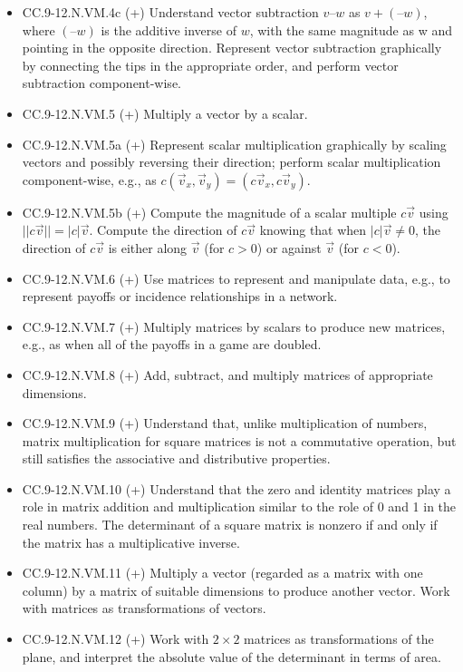 \documentclass{article}
\begin{document}
\begin{enumerate}
\begin{itemize}
		\item CC.9-12.N.VM.4c (+) Understand vector subtraction $v – w$ as $v + (–w)$, where $(–w)$ is the additive inverse of $w$, with the same magnitude as w and pointing in the opposite direction. Represent vector subtraction graphically by connecting the tips in the appropriate order, and perform vector subtraction component-wise.
		\item CC.9-12.N.VM.5 (+)  Multiply a vector by a scalar.
		\item CC.9-12.N.VM.5a (+) Represent scalar multiplication graphically by scaling vectors and possibly reversing their direction; perform scalar multiplication component-wise, e.g., as $c(\vec{v}_x, \vec{v}_y) = (c\vec{v}_x, c\vec{v}_y)$.
		\item CC.9-12.N.VM.5b (+) Compute the magnitude of a scalar multiple $c\vec{v}$ using $||c\vec{v}|| =|c|\vec{v}$. Compute the direction of $c\vec{v}$ knowing that when $|c|\vec{v} \neq 0$, the direction of $c\vec{v}$ is either along $\vec{v}$ (for $c > 0$) or against $\vec{v}$ (for $c < 0$).
		\item CC.9-12.N.VM.6 (+)  Use matrices to represent and manipulate data, e.g., to represent payoffs or incidence relationships in a network. 
		\item CC.9-12.N.VM.7 (+)  Multiply matrices by scalars to produce new matrices, e.g., as when all of the payoffs in a game are doubled. 
		\item CC.9-12.N.VM.8 (+)  Add, subtract, and multiply matrices of appropriate dimensions.
		\item CC.9-12.N.VM.9 (+) Understand that, unlike multiplication of numbers, matrix multiplication for square matrices is not a commutative operation, but still satisfies the associative and distributive properties. 
		\item CC.9-12.N.VM.10 (+) Understand that the zero and identity matrices play a role in matrix addition and multiplication similar to the role of 0 and 1 in the real numbers. The determinant of a square matrix is nonzero if and only if the matrix has a multiplicative inverse. 
		\item CC.9-12.N.VM.11 (+) Multiply a vector (regarded as a matrix with one column) by a matrix of suitable dimensions to produce another vector. Work with matrices as transformations of vectors.
		\item CC.9-12.N.VM.12 (+) Work with $2 \times 2$ matrices as transformations of the plane, and interpret the absolute value of the determinant in terms of area. 
	\end{itemize}
\end{enumerate}
\newpage
\end{document}
